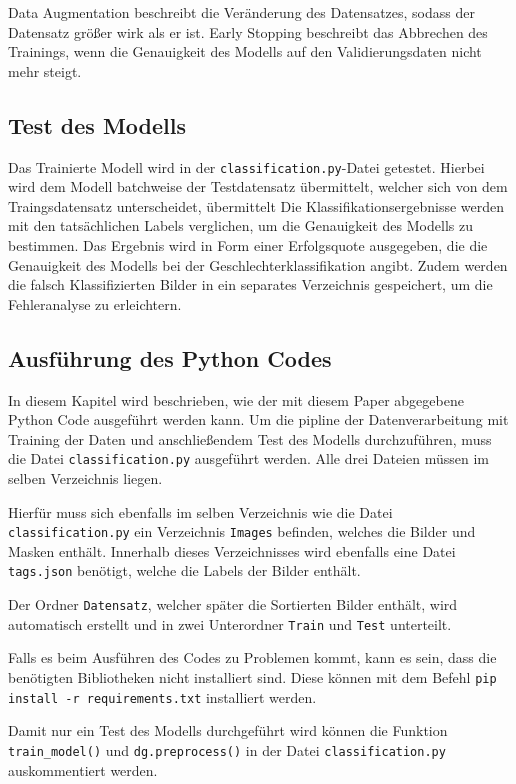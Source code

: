\documentclass[journal,twoside,web]{ieeecolor}
\begin{document}
Data Augmentation beschreibt die Veränderung des Datensatzes, sodass der Datensatz größer wirk als er ist. 
Early Stopping beschreibt das Abbrechen des Trainings, wenn die Genauigkeit des Modells auf den Validierungsdaten nicht mehr steigt.


\subsection{Test des Modells}
Das Trainierte Modell wird in der \texttt{classification.py}-Datei getestet. Hierbei wird dem Modell batchweise der Testdatensatz übermittelt, welcher sich von dem Traingsdatensatz unterscheidet, übermittelt Die Klassifikationsergebnisse werden mit den tatsächlichen Labels verglichen, um die Genauigkeit des Modells zu bestimmen. Das Ergebnis wird in Form einer Erfolgsquote ausgegeben, die die Genauigkeit des Modells bei der Geschlechterklassifikation angibt. Zudem werden die falsch Klassifizierten Bilder in ein separates Verzeichnis gespeichert, um die Fehleranalyse zu erleichtern.

\subsection{Ausführung des Python Codes}

In diesem Kapitel wird beschrieben, wie der mit diesem Paper abgegebene Python Code ausgeführt werden kann.
Um die pipline der Datenverarbeitung mit Training der Daten und anschließendem Test des Modells durchzuführen, muss die Datei \texttt{classification.py} ausgeführt werden. Alle drei Dateien müssen im selben Verzeichnis liegen.

Hierfür muss sich ebenfalls im selben Verzeichnis wie die Datei \texttt{classification.py} ein Verzeichnis \texttt{Images} befinden, welches die Bilder und Masken enthält. Innerhalb dieses Verzeichnisses wird ebenfalls eine Datei \texttt{tags.json} benötigt, welche die Labels der Bilder enthält.

Der Ordner \texttt{Datensatz}, welcher später die Sortierten Bilder enthält, wird automatisch erstellt und in zwei Unterordner \texttt{Train} und \texttt{Test} unterteilt.

Falls es beim Ausführen des Codes zu Problemen kommt, kann es sein, dass die benötigten Bibliotheken nicht installiert sind. Diese können mit dem Befehl \texttt{pip install -r requirements.txt} installiert werden.

Damit nur ein Test des Modells durchgeführt wird können die Funktion \texttt{train\_model()} und \texttt{dg.preprocess()} in der Datei \texttt{classification.py} auskommentiert werden.
\end{document}
